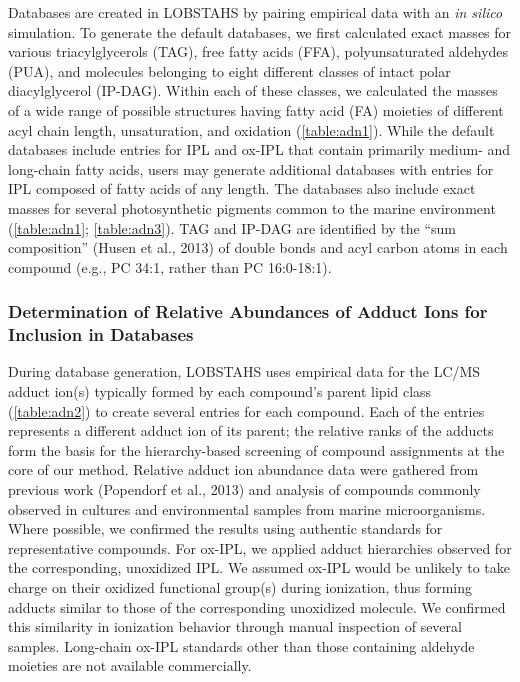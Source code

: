 Databases are created in LOBSTAHS by pairing empirical data with an \emph{in silico} simulation. To generate the default databases, we first calculated exact masses for various triacylglycerols (TAG), free fatty acids (FFA), polyunsaturated aldehydes (PUA), and molecules belonging to eight different classes of intact polar diacylglycerol (IP-DAG). Within each of these classes, we calculated the masses of a wide range of possible structures having fatty acid (FA) moieties of different acyl chain length, unsaturation, and oxidation (\autoref{table:adn1}). While the default databases include entries for IPL and ox-IPL that contain primarily medium- and long-chain fatty acids, users may generate additional databases with entries for IPL composed of fatty acids of any length. The databases also include exact masses for several photosynthetic pigments common to the marine environment (\autoref{table:adn1}; \autoref{table:adn3}). TAG and IP-DAG are identified by the ``sum composition'' (Husen et al., 2013) of double bonds and acyl carbon atoms in each compound (e.g., PC 34:1, rather than PC 16:0-18:1).

\subsubsection{Determination of Relative Abundances of Adduct Ions for Inclusion in Databases}

During database generation, LOBSTAHS uses empirical data for the LC/MS adduct ion(s) typically formed by each compound's parent lipid class (\autoref{table:adn2}) to create several entries for each compound. Each of the entries represents a different adduct ion of its parent; the relative ranks of the adducts form the basis for the hierarchy-based screening of compound assignments at the core of our method. Relative adduct ion abundance data were gathered from previous work (Popendorf et al., 2013) and analysis of compounds commonly observed in cultures and environmental samples from marine microorganisms. Where possible, we confirmed the results using authentic standards for representative compounds. For ox-IPL, we applied adduct hierarchies observed for the corresponding, unoxidized IPL. We assumed ox-IPL would be unlikely to take charge on their oxidized functional group(s) during ionization, thus forming adducts similar to those of the corresponding unoxidized molecule. We confirmed this similarity in ionization behavior through manual inspection of several samples. Long-chain ox-IPL standards other than those containing aldehyde moieties are not available commercially.

